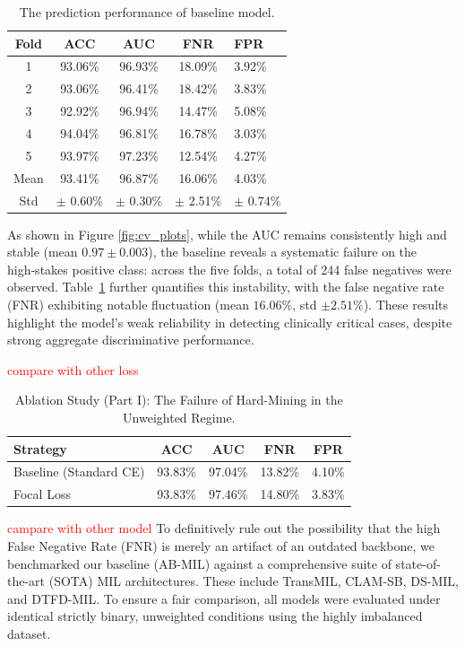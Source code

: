 \documentclass[sigconf,review,anonymous]{acmart}
\theoremstyle{remark}
\begin{document}
\begin{table}[htbp]
    \caption{The prediction performance of baseline model.}
    \label{tab:cv_results}
    \begin{tabular}{ccccl}
    \toprule
    Fold & ACC & AUC & FNR & FPR \\
    \midrule
    1 & 93.06\% & 96.93\% & 18.09\% & 3.92\% \\
    2 & 93.06\% & 96.41\% & 18.42\% & 3.83\% \\
    3 & 92.92\% & 96.94\% & 14.47\% & 5.08\% \\
    4 & 94.04\% & 96.81\% & 16.78\% & 3.03\% \\
    5 & 93.97\% & 97.23\% & 12.54\% & 4.27\% \\
    \midrule
    Mean & 93.41\% & 96.87\% & 16.06\% & 4.03\% \\
    Std & $\pm$ 0.60\% & $\pm$ 0.30\% & $\pm$ 2.51\% & $\pm$ 0.74\% \\
    \bottomrule
    \end{tabular}
    \vskip -0.1in
\end{table}

As shown in Figure \ref{fig:cv_plots}, while the AUC remains consistently high and stable (mean $0.97 \pm 0.003$), the baseline reveals a systematic failure on the high‑stakes positive class: across the five folds, a total of 244 false negatives were observed. Table~\ref{tab:cv_results} further quantifies this instability, with the false negative rate (FNR) exhibiting notable fluctuation (mean $16.06\%$, std $\pm 2.51\%$). These results highlight the model's weak reliability in detecting clinically critical cases, despite strong aggregate discriminative performance.

\textcolor{red}{compare with other loss}
\begin{table}[htbp]
  \centering
  \caption{Ablation Study (Part I): The Failure of Hard-Mining in the Unweighted Regime.}
  \label{tab:loss_unweighted}
  \begin{tabular}{lcccc}
    \toprule
    Strategy & ACC & AUC & FNR & FPR \\
    \midrule
    Baseline (Standard CE) & 93.83\% & 97.04\% & 13.82\% & 4.10\% \\
    Focal Loss             & 93.83\% & 97.46\% & 14.80\% & 3.83\% \\
    \bottomrule
  \end{tabular}
\end{table}


\textcolor{red}{campare with other model}
To definitively rule out the possibility that the high False Negative Rate (FNR) is merely an artifact of an outdated backbone, we benchmarked our baseline (AB-MIL) against a comprehensive suite of state-of-the-art (SOTA) MIL architectures. These include TransMIL, CLAM-SB, DS-MIL, and DTFD-MIL. To ensure a fair comparison, all models were evaluated under identical strictly binary, unweighted conditions using the highly imbalanced dataset. 
\end{document}
